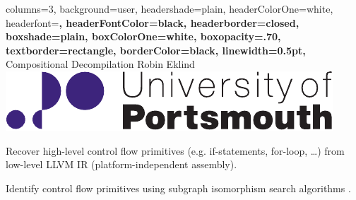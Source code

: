\documentclass[a2paper,landscape,fontscale=0.35]{baposter}
\begin{document}
\begin{poster}{
	columns=3,
	background=user,
	headershade=plain,
	headerColorOne=white,
	headerfont=\Large\bfseries,
	headerFontColor=black,
	headerborder=closed,
	boxshade=plain,
	boxColorOne=white,
	boxopacity=.70,
	textborder=rectangle,
	borderColor=black,
	linewidth=0.5pt,
}
{}
{Compositional Decompilation}
{Robin Eklind}
{\includegraphics[height=0.05\textheight]{inc/logo.pdf}}

{
	Recover high-level control flow primitives (e.g. if-statements, for-loop, …) from low-level LLVM IR (platform-independent assembly).
}

{
	Identify control flow primitives using subgraph isomorphism search algorithms \cite{decomp_llvm}.

}
\end{poster}
\end{document}
